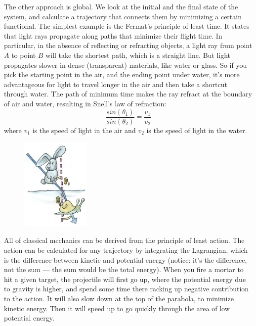 The other approach is global. We look at the initial and the final state
of the system, and calculate a trajectory that connects them by
minimizing a certain functional. The simplest example is the Fermat's
principle of least time. It states that light rays propagate along paths
that minimize their flight time. In particular, in the absence of
reflecting or refracting objects, a light ray from point $A$ to point $B$
will take the shortest path, which is a straight line. But light
propagates slower in dense (transparent) materials, like water or glass.
So if you pick the starting point in the air, and the ending point under
water, it's more advantageous for light to travel longer in the air and
then take a shortcut through water. The path of minimum time makes the
ray refract at the boundary of air and water, resulting in Snell's law
of refraction:
\begin{equation*}
\frac{sin(\theta_1)}{sin(\theta_2)} = \frac{v_1}{v_2}
\end{equation*}
where $v_1$ is the speed of light in the air and $v_2$ is
the speed of light in the water.

\begin{figure}[H]
\centering
\includegraphics[width=0.3\textwidth]{images/snell.jpg}
\end{figure}

\noindent
All of classical mechanics can be derived from the principle of least
action. The action can be calculated for any trajectory by integrating
the Lagrangian, which is the difference between kinetic and potential
energy (notice: it's the difference, not the sum --- the sum would be
the total energy). When you fire a mortar to hit a given target, the
projectile will first go up, where the potential energy due to gravity
is higher, and spend some time there racking up negative contribution to
the action. It will also slow down at the top of the parabola, to
minimize kinetic energy. Then it will speed up to go quickly through the
area of low potential energy.


